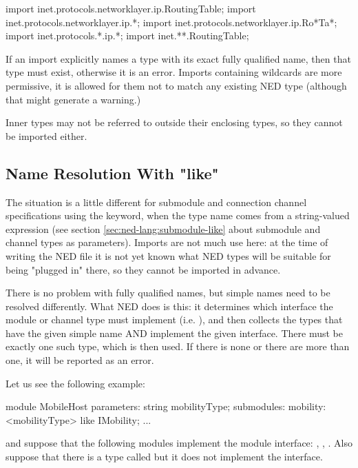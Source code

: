 \begin{ned}
import inet.protocols.networklayer.ip.RoutingTable;
import inet.protocols.networklayer.ip.*;
import inet.protocols.networklayer.ip.Ro*Ta*;
import inet.protocols.*.ip.*;
import inet.**.RoutingTable;
\end{ned}

If an import explicitly names a type with its exact fully qualified name,
then that type must exist, otherwise it is an error. Imports containing
wildcards are more permissive, it is allowed for them not to match any
existing NED type (although that might generate a warning.)

Inner types may not be referred to outside their enclosing types, so they
cannot be imported either.


\subsection{Name Resolution With "like"}
\label{sec:ned-lang:name-resolution-with-like}

The situation is a little different for submodule and connection channel
specifications using the  keyword, when the type name comes
from a string-valued expression (see section
\ref{sec:ned-lang:submodule-like} about submodule and channel types as
parameters). Imports are not much use here: at the time of writing the NED
file it is not yet known what NED types will be suitable for being "plugged
in" there, so they cannot be imported in advance.

There is no problem with fully qualified names, but simple names need
to be resolved differently. What NED does is this: it determines which
interface the module or channel type must implement (i.e. ),
and then collects the types that have the given simple name AND implement
the given interface. There must be exactly one such type, which is then used.
If there is none or there are more than one, it will be reported as an error.

Let us see the following example:

\begin{ned}
module MobileHost
{
    parameters:
        string mobilityType;
    submodules:
        mobility: <mobilityType> like IMobility;
        ...
}
\end{ned}

and suppose that the following modules implement the  module
interface: , ,
. Also suppose that there is a type
called  but it does not implement the
interface.

